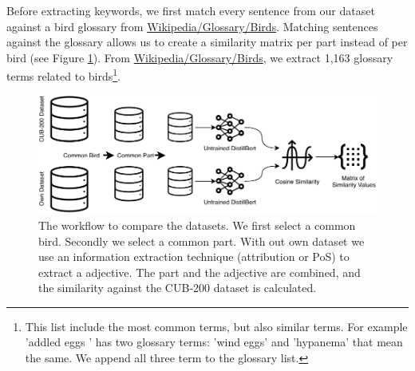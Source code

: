 \documentclass[a4paper, 12pt, oneside]{book} %
\begin{document}
Before extracting keywords, we first match every sentence from our dataset against a bird glossary from \href{https://en.wikipedia.org/wiki/Glossary_of_bird_terms}{Wikipedia/Glossary/Birds}.
Matching sentences against the glossary allows us to create a similarity matrix per part instead of per bird (see Figure \ref{fig:similarity_workflow}).
From \href{https://en.wikipedia.org/wiki/Glossary_of_bird_terms}{Wikipedia/Glossary/Birds}, we extract 1,163 glossary terms related to birds\footnote{This list include the most common terms, but also similar terms. For example 'addled eggs ' has two glossary terms: 'wind eggs' and 'hypanema' that mean the same. We append all three term to the glossary list.}.

\begin{figure} [htbp]
    \centering
    \includegraphics[width=1\textwidth]{figures/Similarity_workflow.pdf}
    \caption[Similarity Workflow]{The workflow to compare the datasets. We first select a common bird. Secondly we select a common part. With out own dataset we use an information extraction technique (attribution or PoS) to extract a adjective. The part and the adjective are combined, and the similarity against the CUB-200 dataset is calculated.}
    \label{fig:similarity_workflow}
\end{figure}
\end{document}
